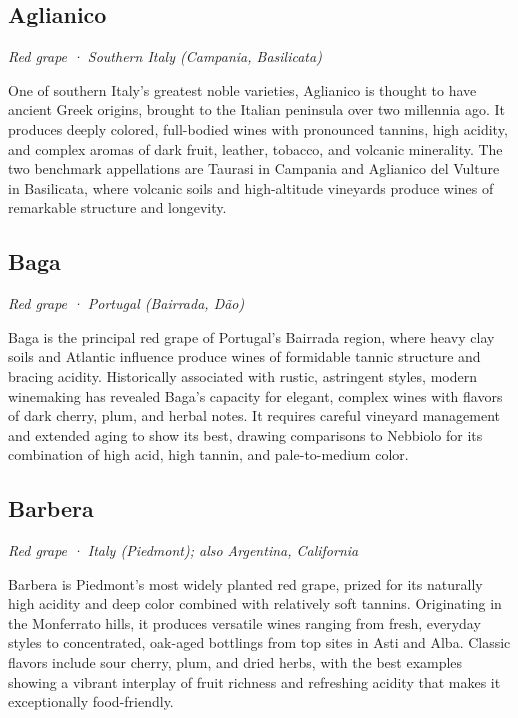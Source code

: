 
\subsection*{Aglianico}
\textit{Red grape · Southern Italy (Campania, Basilicata)}\par\smallskip

One of southern Italy’s greatest noble varieties, Aglianico is thought to have ancient Greek origins, brought to the Italian peninsula over two millennia ago. It produces deeply colored, full-bodied wines with pronounced tannins, high acidity, and complex aromas of dark fruit, leather, tobacco, and volcanic minerality. The two benchmark appellations are Taurasi in Campania and Aglianico del Vulture in Basilicata, where volcanic soils and high-altitude vineyards produce wines of remarkable structure and longevity.

\subsection*{Baga}
\textit{Red grape · Portugal (Bairrada, Dão)}\par\smallskip

Baga is the principal red grape of Portugal’s Bairrada region, where heavy clay soils and Atlantic influence produce wines of formidable tannic structure and bracing acidity. Historically associated with rustic, astringent styles, modern winemaking has revealed Baga’s capacity for elegant, complex wines with flavors of dark cherry, plum, and herbal notes. It requires careful vineyard management and extended aging to show its best, drawing comparisons to Nebbiolo for its combination of high acid, high tannin, and pale-to-medium color.

\subsection*{Barbera}
\textit{Red grape · Italy (Piedmont); also Argentina, California}\par\smallskip

Barbera is Piedmont’s most widely planted red grape, prized for its naturally high acidity and deep color combined with relatively soft tannins. Originating in the Monferrato hills, it produces versatile wines ranging from fresh, everyday styles to concentrated, oak-aged bottlings from top sites in Asti and Alba. Classic flavors include sour cherry, plum, and dried herbs, with the best examples showing a vibrant interplay of fruit richness and refreshing acidity that makes it exceptionally food-friendly.

